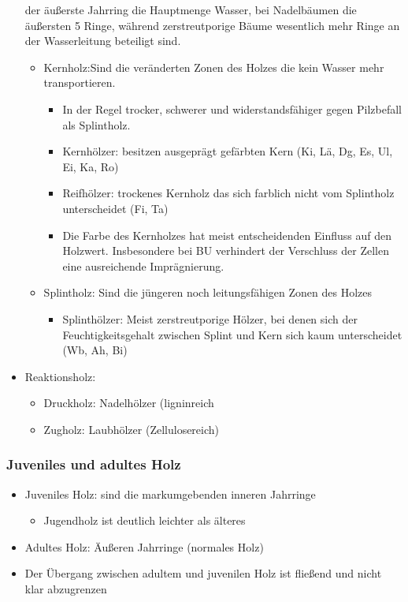 \documentclass{article}
\begin{document}
\begin{itemize}
  der äußerste Jahrring die Hauptmenge Wasser, bei Nadelbäumen die äußersten 5
  Ringe, während zerstreutporige Bäume wesentlich mehr Ringe an der
  Wasserleitung beteiligt sind.
  \begin{itemize}
    \item Kernholz:Sind die veränderten Zonen des Holzes die kein Wasser
    mehr transportieren.
    \begin{itemize}
      \item In der Regel trocker, schwerer und widerstandsfähiger gegen
      Pilzbefall als Splintholz.
      \item Kernhölzer: besitzen ausgeprägt gefärbten Kern (Ki, Lä, Dg, Es, Ul,
      Ei, Ka, Ro)
      \item Reifhölzer: trockenes Kernholz das sich farblich nicht vom
      Splintholz unterscheidet (Fi, Ta)
      \item Die Farbe des Kernholzes hat meist entscheidenden Einfluss auf den
      Holzwert. Insbesondere bei BU verhindert der Verschluss der Zellen eine
      ausreichende Imprägnierung.
    \end{itemize}
  \end{itemize}
  \begin{itemize}
    \item Splintholz: Sind die jüngeren noch leitungsfähigen Zonen des Holzes 
    \begin{itemize}
      \item Splinthölzer: Meist zerstreutporige Hölzer, bei denen sich der
      Feuchtigkeitsgehalt zwischen  Splint und Kern sich kaum unterscheidet (Wb, Ah, Bi)
      \end{itemize}
  \end{itemize}
  \item Reaktionsholz:
  \begin{itemize}
    \item Druckholz: Nadelhölzer (ligninreich
    \item Zugholz: Laubhölzer (Zellulosereich)
    \end{itemize}
\end{itemize}
 
\subsubsection{Juveniles und adultes Holz}
\begin{itemize}
  \item Juveniles Holz: sind die markumgebenden inneren Jahrringe
  \begin{itemize}
    \item Jugendholz ist deutlich leichter als älteres
  \end{itemize}
  \item Adultes Holz: Äußeren Jahrringe (normales Holz)
  \item Der Übergang zwischen adultem und juvenilen Holz ist fließend und
  nicht klar abzugrenzen
\end{itemize}
\end{document}

